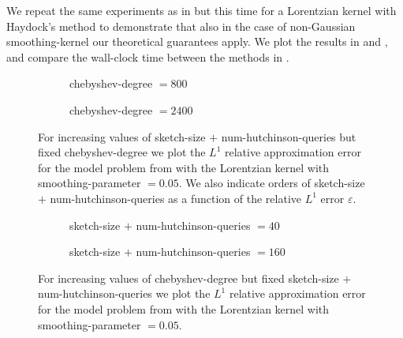 We repeat the same experiments as in 
but this time for a Lorentzian kernel with Haydock's method to demonstrate that
also in the case of non-Gaussian \gls{smoothing-kernel} our theoretical guarantees
apply. We plot the results in  and
, and compare the wall-clock time
between the methods in .\\

\begin{figure}[ht]
    \begin{subfigure}[b]{0.49\columnwidth}
        
        \caption{\gls{chebyshev-degree} $=800$}
        \label{fig:5-experiments-haydock-convergence-nv-m800}
    \end{subfigure}
    \begin{subfigure}[b]{0.49\columnwidth}
        
        \caption{\gls{chebyshev-degree} $=2400$}
        \label{fig:5-experiments-haydock-convergence-nv-m2400}
    \end{subfigure}
    \caption{For increasing values of \gls{sketch-size} $+$ \gls{num-hutchinson-queries}
    but fixed \gls{chebyshev-degree} we plot the $L^1$ relative approximation error 
    for the model problem from  with
    the Lorentzian kernel with \gls{smoothing-parameter} $=0.05$.
    We also indicate orders of \gls{sketch-size} $+$ \gls{num-hutchinson-queries}
    as a function of the relative $L^1$ error $\varepsilon$.}
    \label{fig:5-experiments-haydock-convergence-nv}
\end{figure}

\begin{figure}[ht]
    \centering
    \begin{subfigure}[b]{0.49\columnwidth}
        
        \caption{\gls{sketch-size} $+$ \gls{num-hutchinson-queries} $=40$}
        \label{fig:5-experiments-haydock-convergence-m-nv40}
    \end{subfigure}
    \begin{subfigure}[b]{0.49\columnwidth}
        
        \caption{\gls{sketch-size} $+$ \gls{num-hutchinson-queries} $=160$}
        \label{fig:5-experiments-haydock-convergence-m-nv160}
    \end{subfigure}
    \caption{For increasing values of \gls{chebyshev-degree} but fixed
    \gls{sketch-size} $+$ \gls{num-hutchinson-queries} we plot the $L^1$ relative
    approximation error 
    for the model problem from  with
    the Lorentzian kernel with \gls{smoothing-parameter} $=0.05$.}
    \label{fig:5-experiments-haydock-convergence-m}
\end{figure}

